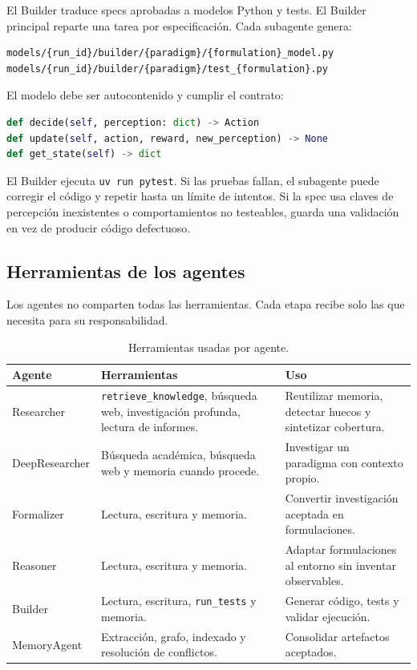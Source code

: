 El Builder traduce specs aprobadas a modelos Python y tests. El Builder
principal reparte una tarea por especificación. Cada subagente genera:

\begin{verbatim}
models/{run_id}/builder/{paradigm}/{formulation}_model.py
models/{run_id}/builder/{paradigm}/test_{formulation}.py
\end{verbatim}

El modelo debe ser autocontenido y cumplir el contrato:

\begin{lstlisting}[language=Python]
def decide(self, perception: dict) -> Action
def update(self, action, reward, new_perception) -> None
def get_state(self) -> dict
\end{lstlisting}

El Builder ejecuta \texttt{uv run pytest}. Si las pruebas fallan, el subagente
puede corregir el código y repetir hasta un límite de intentos. Si la spec usa
claves de percepción inexistentes o comportamientos no testeables, guarda una
validación en vez de producir código defectuoso.

\subsection{Herramientas de los agentes}

Los agentes no comparten todas las herramientas. Cada etapa recibe solo las que
necesita para su responsabilidad.

\begin{table}[H]
\begin{center}
\small
\begin{tabular}{|p{2.8cm}|p{4.2cm}|p{5.2cm}|} \hline
\textbf{Agente} & \textbf{Herramientas} & \textbf{Uso} \\ \hline
Researcher & \texttt{retrieve\_knowledge}, búsqueda web, investigación profunda, lectura de informes. & Reutilizar memoria, detectar huecos y sintetizar cobertura. \\ \hline
DeepResearcher & Búsqueda académica, búsqueda web y memoria cuando procede. & Investigar un paradigma con contexto propio. \\ \hline
Formalizer & Lectura, escritura y memoria. & Convertir investigación aceptada en formulaciones. \\ \hline
Reasoner & Lectura, escritura y memoria. & Adaptar formulaciones al entorno sin inventar observables. \\ \hline
Builder & Lectura, escritura, \texttt{run\_tests} y memoria. & Generar código, tests y validar ejecución. \\ \hline
MemoryAgent & Extracción, grafo, indexado y resolución de conflictos. & Consolidar artefactos aceptados. \\ \hline
\end{tabular}
\caption{Herramientas usadas por agente.}
\end{center}
\end{table}

